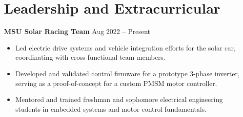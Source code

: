 \section{Leadership and Extracurricular}
\textbf{MSU Solar Racing Team} \hfill Aug 2022 -- Present
\begin{itemize}[noitemsep,leftmargin=1em]
  \item Led electric drive systems and vehicle integration efforts for the solar car, coordinating with cross-functional team members.
  \item Developed and validated control firmware for a prototype 3-phase inverter, serving as a proof-of-concept for a custom PMSM motor controller.
  \item Mentored and trained freshman and sophomore electrical engineering students in embedded systems and motor control fundamentals.
\end{itemize}
